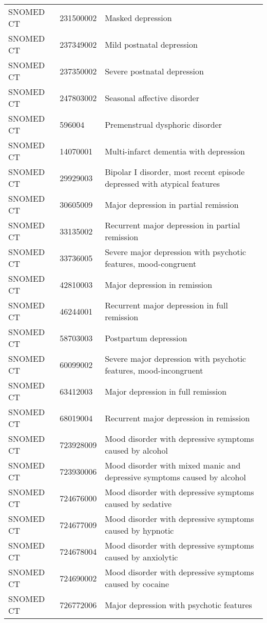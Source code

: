 \begin{longtable}{p{}p{}p{}}
  SNOMED CT & 231500002 & Masked depression \\ 
  SNOMED CT & 237349002 & Mild postnatal depression \\ 
  SNOMED CT & 237350002 & Severe postnatal depression \\ 
  SNOMED CT & 247803002 & Seasonal affective disorder \\ 
  SNOMED CT & 596004 & Premenstrual dysphoric disorder \\ 
  SNOMED CT & 14070001 & Multi-infarct dementia with depression \\ 
  SNOMED CT & 29929003 & Bipolar I disorder, most recent episode depressed with atypical features \\ 
  SNOMED CT & 30605009 & Major depression in partial remission \\ 
  SNOMED CT & 33135002 & Recurrent major depression in partial remission \\ 
  SNOMED CT & 33736005 & Severe major depression with psychotic features, mood-congruent \\ 
  SNOMED CT & 42810003 & Major depression in remission \\ 
  SNOMED CT & 46244001 & Recurrent major depression in full remission \\ 
  SNOMED CT & 58703003 & Postpartum depression \\ 
  SNOMED CT & 60099002 & Severe major depression with psychotic features, mood-incongruent \\ 
  SNOMED CT & 63412003 & Major depression in full remission \\ 
  SNOMED CT & 68019004 & Recurrent major depression in remission \\ 
  SNOMED CT & 723928009 & Mood disorder with depressive symptoms caused by alcohol \\ 
  SNOMED CT & 723930006 & Mood disorder with mixed manic and depressive symptoms caused by alcohol \\ 
  SNOMED CT & 724676000 & Mood disorder with depressive symptoms caused by sedative \\ 
  SNOMED CT & 724677009 & Mood disorder with depressive symptoms caused by hypnotic \\ 
  SNOMED CT & 724678004 & Mood disorder with depressive symptoms caused by anxiolytic \\ 
  SNOMED CT & 724690002 & Mood disorder with depressive symptoms caused by cocaine \\ 
  SNOMED CT & 726772006 & Major depression with psychotic features \\ 

\end{longtable}
